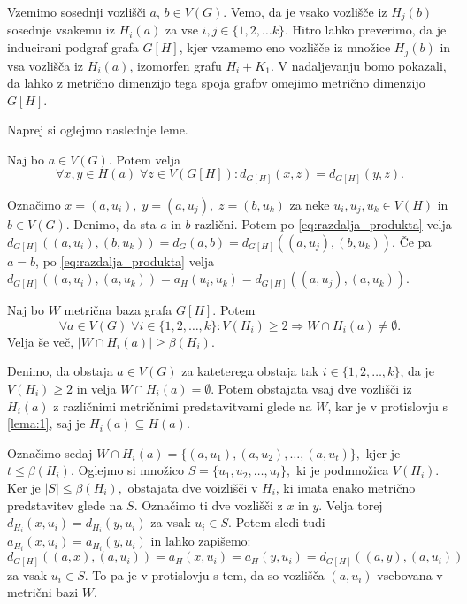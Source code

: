 \documentclass[mat1, tisk]{fmfdelo}
\newcommand{\1}{(1, 1, \ldots, 1)}
\newcommand{\2}{(2, 2, \ldots, 2)}
\begin{document}
Vzemimo sosednji vozlišči $a$, $b \in V(G)$. Vemo, da je vsako vozlišče iz $H_j(b)$ 
sosednje vsakemu iz $H_i(a)$ za vse $i, j \in \{1, 2, \ldots k\}$.  
Hitro lahko preverimo, da je inducirani podgraf grafa $G[H]$, kjer vzamemo eno 
vozlišče iz množice $H_j(b)$ in vsa vozlišča iz $H_i(a)$, izomorfen grafu $H_i + K_1.$ 
V nadaljevanju bomo pokazali, da lahko z metrično dimenzijo tega spoja grafov
omejimo metrično dimenzijo $G[H]$.

Naprej si oglejmo naslednje leme.

\begin{lema} \label{lema:1}
    Naj bo $a\in V(G)$. Potem velja 
    $$\forall x, y \in H(a) \; \forall z \in V(G[H]): d_{G[H]}(x,z) = d_{G[H]}(y,z).$$
\end{lema}

\begin{dokaz}
        Označimo $x = (a, u_i), \; y = (a, u_j), \; z = (b, u_k)$ za neke $u_i, u_j, u_k \in V(H)$ in $b \in V(G)$.
        Denimo, da sta $a$ in $b$ različni. Potem po \eqref{eq:razdalja_produkta} velja 
        $d_{G[H]}((a, u_i), (b, u_k)) = d_G(a, b) = d_{G[H]}((a, u_j), (b, u_k))$. 
        Če pa $a = b$, po \eqref{eq:razdalja_produkta} velja $d_{G[H]}((a, u_i), (a, u_k)) = 
        a_H(u_i, u_k) = d_{G[H]}((a, u_j), (a, u_k))$. 
 \end{dokaz}

\begin{lema} \label{lema:2}
    Naj bo $W$ metrična baza grafa $G[H]$. Potem 
   $$\forall a \in V(G) \; \forall i \in \{1, 2, \ldots, k\} : V(H_i) \geq 2 \Rightarrow W \cap H_i(a) \neq \emptyset.$$
   Velja še več, $|W \cap H_i(a)| \geq \beta(H_i).$
\end{lema}

\begin{dokaz}
    Denimo, da obstaja $a \in V(G)$ za kateterega obstaja tak $i \in \{1, 2, \ldots, k\}$, da je
    $V(H_i) \geq 2$ in velja $ W \cap H_i(a) = \emptyset$. Potem obstajata vsaj dve vozlišči iz $H_i(a)$ z različnimi
    metričnimi predstavitvami glede na $W$, kar je v protislovju s \ref{lema:1}, saj je $H_i(a) \subseteq H(a)$.

    Označimo sedaj $W \cap H_i(a) = \{ (a, u_1), (a, u_2), \ldots , (a, u_t)\},$ kjer je $t \leq \beta(H_i).$
    Oglejmo si množico $S = \{u_1, u_2, \ldots, u_t\},$ ki je podmnožica $V(H_i).$ Ker je $|S| \leq \beta(H_i),$
    obstajata dve voizlišči v $H_i$, ki imata enako metrično predstavitev glede na $S$. Označimo ti dve vozlišči
    z $x$ in $y$. Velja torej $d_{H_i}(x, u_i) = d_{H_i}(y, u_i)$ za vsak $u_i \in S$. Potem sledi tudi
    $a_{H_i}(x, u_i) = a_{H_i}(y, u_i)$ in lahko zapišemo:
    $$d_{G[H]}((a, x), (a, u_i)) = a_H(x, u_i) = a_H(y, u_i) = d_{G[H]}((a, y), (a, u_i))$$ za vsak $u_i \in S.$
    To pa je v protislovju s tem, da so vozlišča $(a, u_i)$ vsebovana v metrični bazi $W$.
\end{dokaz}
\end{document}
